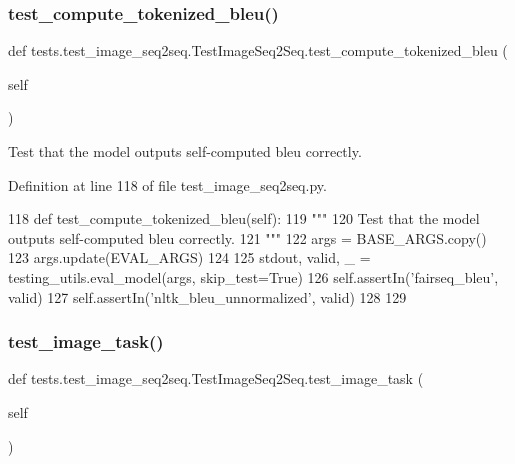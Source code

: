 \subsubsection{\texorpdfstring{test\+\_\+compute\+\_\+tokenized\+\_\+bleu()}{test\_compute\_tokenized\_bleu()}}
{\footnotesize\ttfamily def tests.\+test\+\_\+image\+\_\+seq2seq.\+Test\+Image\+Seq2\+Seq.\+test\+\_\+compute\+\_\+tokenized\+\_\+bleu (\begin{DoxyParamCaption}\item[{}]{self }\end{DoxyParamCaption})}

\begin{DoxyVerb}Test that the model outputs self-computed bleu correctly.
\end{DoxyVerb}
 

Definition at line 118 of file test\+\_\+image\+\_\+seq2seq.\+py.


\begin{DoxyCode}
118     \textcolor{keyword}{def }test\_compute\_tokenized\_bleu(self):
119         \textcolor{stringliteral}{"""}
120 \textcolor{stringliteral}{        Test that the model outputs self-computed bleu correctly.}
121 \textcolor{stringliteral}{        """}
122         args = BASE\_ARGS.copy()
123         args.update(EVAL\_ARGS)
124 
125         stdout, valid, \_ = testing\_utils.eval\_model(args, skip\_test=\textcolor{keyword}{True})
126         self.assertIn(\textcolor{stringliteral}{'fairseq\_bleu'}, valid)
127         self.assertIn(\textcolor{stringliteral}{'nltk\_bleu\_unnormalized'}, valid)
128 
129 
\end{DoxyCode}
\mbox{\label{classtests_1_1test__image__seq2seq_1_1TestImageSeq2Seq_ad1c4737a9b40a1d788c01defbef1f99c}} 
\subsubsection{\texorpdfstring{test\+\_\+image\+\_\+task()}{test\_image\_task()}}
{\footnotesize\ttfamily def tests.\+test\+\_\+image\+\_\+seq2seq.\+Test\+Image\+Seq2\+Seq.\+test\+\_\+image\+\_\+task (\begin{DoxyParamCaption}\item[{}]{self }\end{DoxyParamCaption})}

